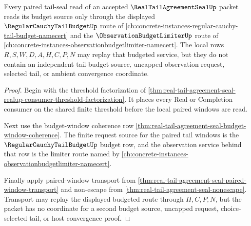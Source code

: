 \begin{theorem}
\label{thm:real-tail-agreement-seal-budget-source-lock}
Every paired tail-seal read of an accepted $\RealTailAgreementSealUp$ packet reads its budget source only through the displayed $\RegularCauchyTailBudgetUp$ route of \autoref{ch:concrete-instances-regular-cauchy-tail-budget-namecert} and the $\ObservationBudgetLimiterUp$ route of \autoref{ch:concrete-instances-observationbudgetlimiter-namecert}. The local rows $R,S,W,D,A,H,C,P,N$ may replay that budgeted service, but they do not contain an independent tail-budget source, uncapped observation request, selected tail, or ambient convergence coordinate.
\end{theorem}
\begin{proof}
Begin with the threshold factorization of \autoref{thm:real-tail-agreement-seal-realup-consumer-threshold-factorization}. It places every Real or Completion consumer on the shared finite threshold before the local paired windows are read.

Next use the budget-window coherence row \autoref{thm:real-tail-agreement-seal-budget-window-coherence}. The finite request source for the paired tail windows is the $\RegularCauchyTailBudgetUp$ budget row, and the observation service behind that row is the limiter route named by \autoref{ch:concrete-instances-observationbudgetlimiter-namecert}.

Finally apply paired-window transport from \autoref{thm:real-tail-agreement-seal-paired-window-transport} and non-escape from \autoref{thm:real-tail-agreement-seal-nonescape}. Transport may replay the displayed budgeted route through $H,C,P,N$, but the packet has no coordinate for a second budget source, uncapped request, choice-selected tail, or host convergence proof.
\end{proof}

